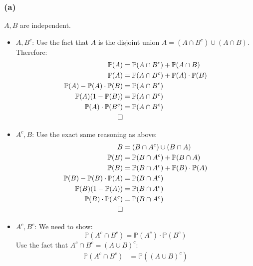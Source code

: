 \documentclass{article}
\begin{document}
\subsubsection*{(a)}
$A, B$ are independent.
    \begin{itemize}
        \item $A, B^c$: Use the fact that $A$ is the disjoint union $A = (A \cap B^c) \cup (A \cap B)$. Therefore:
        \begin{align*}
            \mathbb{P}(A) &= \mathbb{P}(A \cap B^c) + \mathbb{P}(A \cap B) \\
            \mathbb{P}(A) &= \mathbb{P}(A \cap B^c) + \mathbb{P}(A)\cdot\mathbb{P}(B) \\
            \mathbb{P}(A) - \mathbb{P}(A)\cdot\mathbb{P}(B) &= \mathbb{P}(A \cap B^c) \\
            \mathbb{P}(A)(1 - \mathbb{P}(B)) &= \mathbb{P}(A \cap B^c) \\
            \mathbb{P}(A)\cdot\mathbb{P}(B^c) &= \mathbb{P}(A \cap B^c) \\ 
            \qed
        \end{align*}
        \item $A^c, B$: Use the exact same reasoning as above:
        \begin{align*}
            B &= (B \cap A^c) \cup (B \cap A) \\
            \mathbb{P}(B) &= \mathbb{P}(B \cap A^c) + \mathbb{P}(B \cap A) \\
            \mathbb{P}(B) &= \mathbb{P}(B \cap A^c) + \mathbb{P}(B)\cdot\mathbb{P}(A) \\
            \mathbb{P}(B) - \mathbb{P}(B)\cdot\mathbb{P}(A) &= \mathbb{P}(B \cap A^c) \\
            \mathbb{P}(B)(1 - \mathbb{P}(A)) &= \mathbb{P}(B \cap A^c) \\
            \mathbb{P}(B)\cdot\mathbb{P}(A^c) &= \mathbb{P}(B \cap A^c) \\ 
            \qed
        \end{align*}
        \item $A^c, B^c$: We need to show:
        \begin{equation}
            \mathbb{P}(A^c \cap B^c) = \mathbb{P}(A^c)\cdot\mathbb{P}(B^c)
        \end{equation}
        Use the fact that $A^c \cap B^c = (A \cup B)^c$:
        \begin{align*}
            \mathbb{P}(A^c \cap B^c) &= \mathbb{P}((A \cup B)^c) \\

\end{align*}
\end{itemize}
\end{document}

